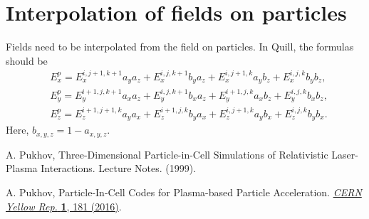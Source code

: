 \documentclass[12pt,a4paper,DIV=calc]{scrartcl}
\begin{document}
\section{Interpolation of fields on particles}
Fields need to be interpolated from the field on particles.
In Quill, the formulas should be
\begin{align}
    &E_x^p = E_x^{i,j+1,k+1} a_y a_z + E_x^{i,j,k+1} b_y a_z + E_x^{i,j+1,k} a_y b_z + E_x^{i,j,k} b_y b_z,\\
    &E_y^p = E_y^{i+1,j,k+1} a_x a_z + E_y^{i,j,k+1} b_x a_z + E_y^{i+1,j,k} a_x b_z + E_y^{i,j,k} b_x b_z,\\
    &E_z^p = E_z^{i+1,j+1,k} a_y a_x + E_z^{i+1,j,k} b_y a_x + E_z^{i,j+1,k} a_y b_x + E_z^{i,j,k} b_y b_x.
\end{align}
Here, $b_{x,y,z} = 1 - a_{x,y,z}$.

\begin{thebibliography}{9}
    A. Pukhov, Three-Dimensional Particle-in-Cell Simulations of Relativistic Laser-Plasma Interactions. Lecture Notes. (1999).
    
    A. Pukhov, Particle-In-Cell Codes for Plasma-based Particle Acceleration. \href{https://e-publishing.cern.ch/index.php/CYR/article/view/220}{\textit{CERN Yellow Rep.} \textbf{1}, 181 (2016)}.
\end{thebibliography}
\end{document}
